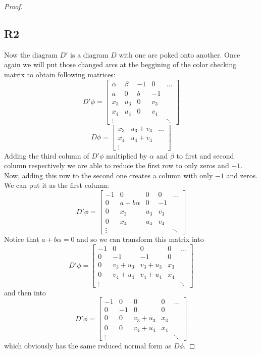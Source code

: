 \begin{proof}
  \subsection*{\centering R2}

  Now the diagram $D'$ is a diagram $D$ with one arc poked onto another. Once again we will put those changed arcs at the beggining of the color checking matrix to obtain following matrices:
  $$
  D'\phi=
  \begin{bmatrix}
    \alpha & \beta & -1 & 0 & \hdots \\ 
    a & 0 & b & -1  \\ 
    x_3 & u_3 & 0 & v_3 \\ 
    x_4 & u_4 & 0 & v_4 \\ 
    \vdots & & & & \ddots
  \end{bmatrix}
  $$
  $$
  D\phi= 
  \begin{bmatrix}
    x_3 & u_3 + v_3 & \hdots \\ 
    x_4 & u_4 + v_4 \\ 
    \vdots
  \end{bmatrix}
  $$
  Adding the third column of $D'\phi$ multiplied by $\alpha$ and $\beta$ to first and second column respectively we are able to reduce the first row to only zeros and $-1$. Now, adding this row to the second one creates a column with only $-1$ and zeros. We can put it as the first column:
  $$
  D'\phi=
  \begin{bmatrix}
    -1 & 0 & 0 & 0 & \hdots \\ 
    0 & a +b\alpha & 0 & -1  \\ 
    0 & x_3 & u_3 & v_3 \\ 
    0 & x_4 & u_4 & v_4 \\ 
    \vdots & & & & \ddots
  \end{bmatrix}
  $$
  Notice that $a+b\alpha=0$ and so we can transform this matrix into
  $$
  D'\phi=
  \begin{bmatrix}
    -1 & 0 & 0 & 0 & \hdots \\ 
    0 & -1 & -1 & 0  \\ 
    0 & v_3 +u_3 & v_3+u_3&  x_3 & \\ 
    0 & v_4 +u_4 & v_4+u_4 & x_4 \\ 
    \vdots & & & & \ddots
  \end{bmatrix}
  $$
  and then into 
  $$
  D'\phi=
  \begin{bmatrix}
    -1 & 0 & 0 & 0 & \hdots \\ 
    0 & -1 & 0 & 0  \\ 
    0 & 0 & v_3+u_3&  x_3 & \\ 
    0 & 0 & v_4+u_4 & x_4 \\ 
    \vdots & & & & \ddots
  \end{bmatrix}
  $$
  which obviously has the same reduced normal form as $D\phi$.


\end{proof}
